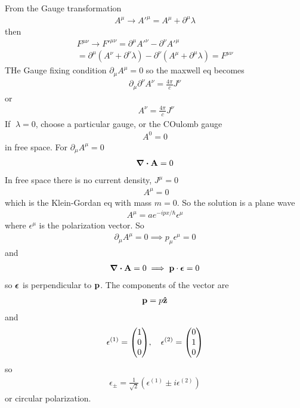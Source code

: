 \documentclass[../main.tex]{subfiles}
\begin{document}
From the Gauge transformation
\begin{align*}
    A^\mu \to A'^\mu = A^\mu + \partial^\mu \lambda
\end{align*}
then 
\begin{align*}
    F^{\mu\nu} \to F'^{\mu\nu} = \partial^\mu A'^\nu - \partial^\nu A'^\mu \\
    = \partial^\mu (A^\nu + \partial^\nu \lambda) - \partial^\nu (A^\mu + \partial^\mu  \lambda) = F^{\mu\nu}
\end{align*}
THe Gauge fixing condition $\partial_\mu A^\mu = 0$ so the maxwell eq becomes
\begin{align*}
    \partial_\mu \partial^\nu A^\nu = \frac{4\pi}{c} J^\nu
\end{align*}
or
\begin{align*}
    \boxed{\;} A^\nu = \frac{4\pi}{c} J^\nu
\end{align*}
If $\boxed{\;} \lambda = 0$, choose a particular gauge, or the COulomb gauge
\begin{align*}
    A^0 = 0 
\end{align*}
in free space. For $\partial_\mu A^\mu = 0$
\begin{align*}
    \div \vb A = 0
\end{align*}
In free space there is no current density, $J^\mu = 0$
\begin{align*}
    \boxed{\;} A^\mu = 0
\end{align*}
which is the Klein-Gordan eq with mass $m = 0$. So the solution is a plane wave
\begin{align*}
    A^\mu = a e^{-ip x / \hbar} \epsilon^\mu
\end{align*}
where $\epsilon^\mu$ is the polarization vector. So
\begin{align*}
    \partial_\mu A^\mu = 0 \implies p_\mu \epsilon^\mu = 0
\end{align*}
and 
\begin{align*}
    \div{\vb A} = 0 \implies \vb p \cdot \vb*{\epsilon} = 0
\end{align*}
so $\vb*{\epsilon}$ is perpendicular to $\vb p$. The components of the vector are
\begin{align*}
    \vb p = p \vu z
\end{align*}
and 
\begin{align*}
    \epsilon^{(1)} = \mqty(1 \\ 0 \\ 0), \quad \epsilon^{(2)} = \mqty(0 \\ 1 \\ 0)
\end{align*}
so
\begin{align*}
    \epsilon_{\pm} = \frac{1}{\sqrt{2}} (\epsilon^{(1)} \pm i \epsilon^{(2)})
\end{align*}
or circular polarization. 
\end{document}
